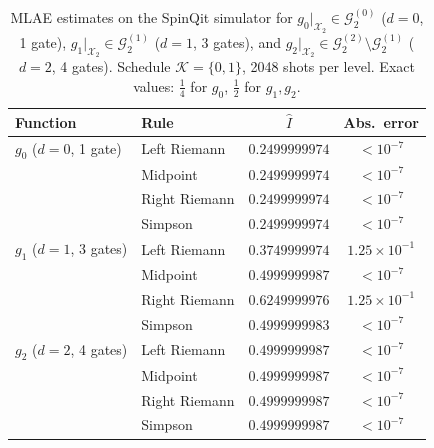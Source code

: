 \documentclass[12pt,a4paper]{article}
\theoremstyle{plain}
\theoremstyle{definition}
\theoremstyle{remark}
\newcommand{\Gclass}[2]{\mathcal{G}_{#1}^{(#2)}}
\begin{document}
\begin{table}[h]
\centering
\caption{MLAE estimates on the SpinQit simulator for
$g_0|_{\mathcal{X}_2}\in\Gclass{2}{0}$ ($d=0$, 1 gate),
$g_1|_{\mathcal{X}_2}\in\Gclass{2}{1}$ ($d=1$, 3 gates), and
$g_2|_{\mathcal{X}_2}\in\Gclass{2}{2}\setminus\Gclass{2}{1}$ ($d=2$, 4 gates).
Schedule $\mathcal{K}=\{0,1\}$, 2048 shots per level.
Exact values: $\tfrac{1}{4}$ for $g_0$, $\tfrac{1}{2}$ for $g_1, g_2$.}
\label{tab:results_sim}
\begin{threeparttable}
\renewcommand{\arraystretch}{1.3}
\begin{tabular}{llcc}
\toprule
Function & Rule & $\hat{I}$ & Abs.\ error \\
\midrule
$g_0$ ($d=0$, 1 gate)
  & Left Riemann  & $0.2499999974$ & $<10^{-7}$ \\
  & Midpoint      & $0.2499999974$ & $<10^{-7}$ \\
  & Right Riemann & $0.2499999974$ & $<10^{-7}$ \\
  & Simpson       & $0.2499999974$ & $<10^{-7}$ \\
\midrule
$g_1$ ($d=1$, 3 gates)
  & Left Riemann  & $0.3749999974$ & $1.25\times10^{-1}$\tnote{a} \\
  & Midpoint      & $0.4999999987$ & $<10^{-7}$\tnote{b} \\
  & Right Riemann & $0.6249999976$ & $1.25\times10^{-1}$\tnote{a} \\
  & Simpson       & $0.4999999983$ & $<10^{-7}$\tnote{b} \\
\midrule
$g_2$ ($d=2$, 4 gates)
  & Left Riemann  & $0.4999999987$ & $<10^{-7}$\tnote{b} \\
  & Midpoint      & $0.4999999987$ & $<10^{-7}$\tnote{b} \\
  & Right Riemann & $0.4999999987$ & $<10^{-7}$\tnote{b} \\
  & Simpson       & $0.4999999987$ & $<10^{-7}$\tnote{b} \\
\bottomrule
\end{tabular}
\end{threeparttable}
\end{table}
\end{document}
